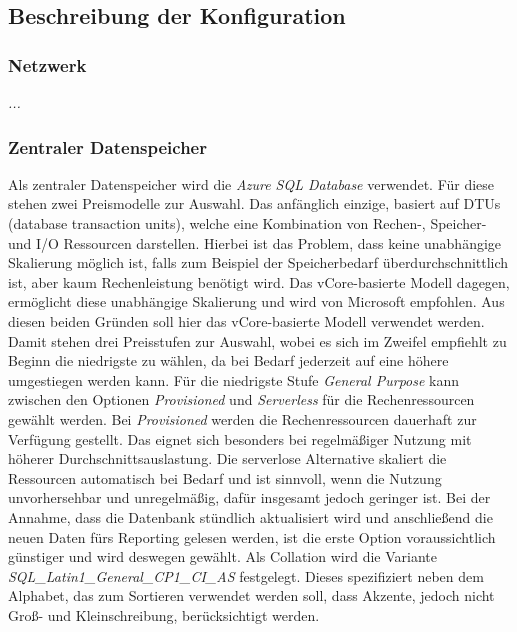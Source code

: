 \subsection{Beschreibung der Konfiguration} \label{subsec:infra:konfig}

\subsubsection{Netzwerk} \label{subsec:infra:konfig:netzwerk}
\textit{...}

\subsubsection{Zentraler Datenspeicher} \label{subsec:infra:konfig:datenspeicher}
Als zentraler Datenspeicher wird die \textit{Azure SQL Database} verwendet. Für diese stehen zwei Preismodelle zur Auswahl. Das anfänglich einzige, basiert auf DTUs (database transaction units), welche eine Kombination von Rechen-, Speicher- und I/O Ressourcen darstellen. Hierbei ist das Problem, dass keine unabhängige Skalierung möglich ist, falls zum Beispiel der Speicherbedarf überdurchschnittlich ist, aber kaum Rechenleistung benötigt wird. Das vCore-basierte Modell dagegen, ermöglicht diese unabhängige Skalierung und wird von Microsoft empfohlen. Aus diesen beiden Gründen soll hier das vCore-basierte Modell verwendet werden. Damit stehen drei Preisstufen zur Auswahl, wobei es sich im Zweifel empfiehlt zu Beginn die niedrigste zu wählen, da bei Bedarf jederzeit auf eine höhere umgestiegen werden kann. Für die niedrigste Stufe \textit{General Purpose} kann zwischen den Optionen \textit{Provisioned} und \textit{Serverless} für die Rechenressourcen gewählt werden. Bei \textit{Provisioned} werden die Rechenressourcen dauerhaft zur Verfügung gestellt. Das eignet sich besonders bei regelmäßiger Nutzung mit höherer Durchschnittsauslastung. Die serverlose Alternative skaliert die Ressourcen automatisch bei Bedarf und ist sinnvoll, wenn die Nutzung unvorhersehbar und unregelmäßig, dafür insgesamt jedoch geringer ist. Bei der Annahme, dass die Datenbank stündlich aktualisiert wird und anschließend die neuen Daten fürs Reporting gelesen werden, ist die erste Option voraussichtlich günstiger und wird deswegen gewählt. Als Collation wird die Variante \textit{SQL{\_}Latin1{\_}General{\_}CP1{\_}CI{\_}AS} festgelegt. Dieses spezifiziert neben dem Alphabet, das zum Sortieren verwendet werden soll, dass Akzente, jedoch nicht Groß- und Kleinschreibung, berücksichtigt werden. \cite[vgl.][]{mauri_azure_2021}

